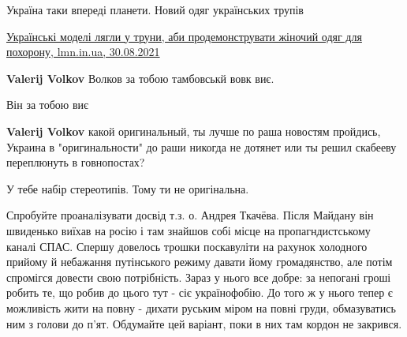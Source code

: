 \begin{itemize}
Україна таки впереді планети.
Новий одяг українських трупів

\href{https://www.lmn.in.ua/ukrainski-modeli-liahly-u-truny-aby-prodemonstruvaty-zhinochyj-odiah-dlia-pokhoronu/}{%
Українські моделі лягли у труни, аби продемонструвати жіночий одяг для похорону, lmn.in.ua, 30.08.2021%
}

\begin{itemize}
 
\textbf{Valerij Volkov} Волков за тобою тамбовськй вовк виє.

 
Він за тобою виє

 
\textbf{Valerij Volkov} какой оригинальный, ты лучше по раша новостям пройдись,
Украина в "оригинальности" до раши никогда не дотянет или ты решил скабееву
переплюнуть в говнопостах?

 
У тебе набір стереотипів.
Тому ти не оригінальна.
\end{itemize}

 

Спробуйте проаналізувати досвід т.з. о. Андрея Ткачёва. Після Майдану він
швиденько виїхав на росію і там знайшов собі місце на пропагндистському каналі
СПАС. Спершу довелось трошки поскавуліти на рахунок холодного прийому й
небажання путінського режиму давати йому громадянство, але потім спромігся
довести свою потрібність. Зараз у нього все добре: за непогані гроші робить те,
що робив до цього тут - сіє українофобію. До того ж у нього тепер є можливість
жити на повну - дихати руським міром на повні груди, обмазуватись ним з голови
до п'ят. Обдумайте цей варіант, поки в них там кордон не закрився.



\end{itemize}
